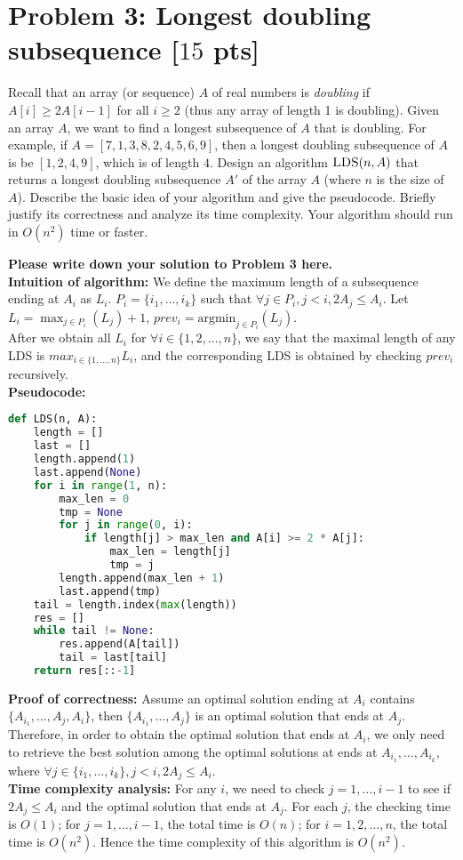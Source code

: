\documentclass[11pt,twoside]{article}
\newcommand{\problem}[1]{\section*{Problem #1}}
\newenvironment{solution}{{\par\noindent\it Solution.}}{}
\begin{document}
\problem{3: Longest doubling subsequence [$15$ pts]}
Recall that an array (or sequence) $A$ of real numbers is \textit{doubling} if $A[i] \geq 2A[i-1]$ for all $i \geq 2$ (thus any array of length 1 is doubling).
Given an array $A$, we want to find a longest subsequence of $A$ that is doubling.
For example, if $A = [7,1,3,8,2,4,5,6,9]$, then a longest doubling subsequence of $A$ is be $[1,2,4,9]$, which is of length $4$.
Design an algorithm $\textsc{LDS}(n,A)$ that returns a longest doubling subsequence $A'$ of the array $A$ (where $n$ is the size of $A$).
Describe the basic idea of your algorithm and give the pseudocode.
Briefly justify its correctness and analyze its time complexity.
Your algorithm should run in $O(n^2)$ time or faster. 

\begin{solution}
\textbf{Please write down your solution to Problem 3 here.}
\vspace{5pt}\\
\textbf{Intuition of algorithm: }We define the maximum length of a subsequence ending at $A_i$ as $L_i$.
$P_i=\{i_1,\dots,i_k\}$ such that $\forall j\in P_i, j<i, 2A_{j}\leq A_{i}$. Let $L_i=\max_{j\in P_i}(L_j) + 1$,
$prev_i=\text{argmin}_{j\in P_i}(L_j)$.\\
After we obtain all $L_i$ for $\forall i\in\{1,2,\dots,n\}$, we say that the maximal length of any LDS is $max_{i\in\{1,\dots,n\}}L_i$,
and the corresponding LDS is obtained by checking $prev_i$ recursively.
\vspace{5pt}\\
\textbf{Pseudocode: }
\begin{lstlisting}[language=Python]
def LDS(n, A):
    length = []
    last = []
    length.append(1)
    last.append(None)
    for i in range(1, n):
        max_len = 0
        tmp = None
        for j in range(0, i):
            if length[j] > max_len and A[i] >= 2 * A[j]:
                max_len = length[j]
                tmp = j
        length.append(max_len + 1)
        last.append(tmp)
    tail = length.index(max(length))
    res = []
    while tail != None:
        res.append(A[tail])
        tail = last[tail]
    return res[::-1]
\end{lstlisting}
\vspace{5pt}
\textbf{Proof of correctness: }Assume an optimal solution ending at $A_i$ contains $\{A_{i_1},\dots, A_j, A_i\}$,
then $\{A_{i_1},\dots,A_j\}$ is an optimal solution that ends at $A_j$. 
Therefore, in order to obtain the optimal solution that ends at $A_i$, 
we only need to retrieve the best solution among the optimal solutions at ends at $A_{i_1}, \dots, A_{i_k}$,
where $\forall j\in \{i_1,\dots,i_k\}, j<i, 2A_{j}\leq A_{i}$.
\vspace{5pt}\\
\textbf{Time complexity analysis: }For any $i$, 
we need to check $j=1,\dots,i-1$ to see if $2A_j\leq A_i$ and the optimal solution that ends at $A_j$.
For each $j$, the checking time is $O(1)$; for $j=1,\dots,i-1$, the total time is $O(n)$; 
for $i=1,2,\dots,n$, the total time is $O(n^2)$. Hence the time complexity of this algorithm is $O(n^2)$.
\end{solution}
\end{document}
